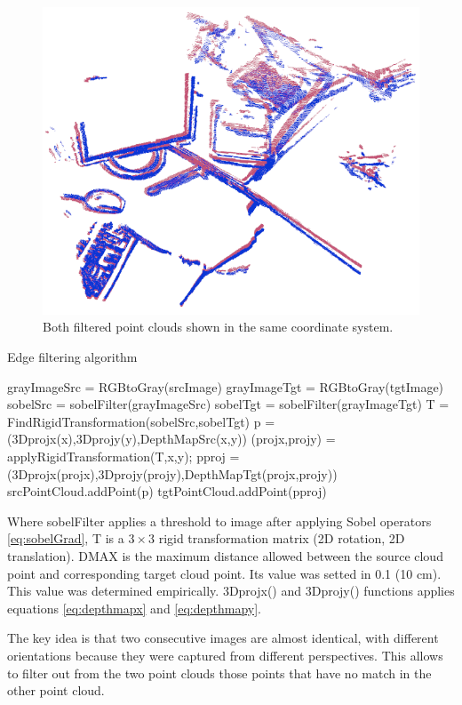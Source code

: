 \begin{figure}[H]
\begin{center}
\includegraphics[scale=0.3]{images/borders_both.png}
\caption{Both filtered point clouds shown in the same coordinate system.}
\end{center}
\end{figure}


\begin{algorithm}[H]
\caption{Edge filtering algorithm}
\label{alg:edges}
\begin{algorithmic}[1]
\State grayImageSrc = RGBtoGray(srcImage)
\State grayImageTgt = RGBtoGray(tgtImage)
\State sobelSrc = sobelFilter(grayImageSrc)
\State sobelTgt = sobelFilter(grayImageTgt)
\State T = FindRigidTransformation(sobelSrc,sobelTgt)
\State p = (3Dprojx(x),3Dprojy(y),DepthMapSrc(x,y))
\State (projx,projy) = applyRigidTransformation(T,x,y);
\State pproj = (3Dprojx(projx),3Dprojy(projy),DepthMapTgt(projx,projy))
\State srcPointCloud.addPoint(p)
\State tgtPointCloud.addPoint(pproj)
\EndIf
\EndIf
\EndIf
\EndFor
\end{algorithmic}
\end{algorithm}

Where sobelFilter applies a threshold to image after applying Sobel operators \ref{eq:sobelGrad}, T is a $3\times3$ rigid transformation matrix (2D rotation, 2D translation). DMAX is the maximum distance allowed between the source cloud point and corresponding target cloud point. 
Its value was setted in 0.1 (10 cm).  This value was determined empirically. 3Dprojx() and 3Dprojy() functions applies equations \ref{eq:depthmapx} and \ref{eq:depthmapy}.

The key idea is that two consecutive images are almost identical, 
with different orientations because they were captured from different perspectives. This allows 
to filter out from the two point clouds those points that have no match in the other point cloud.

